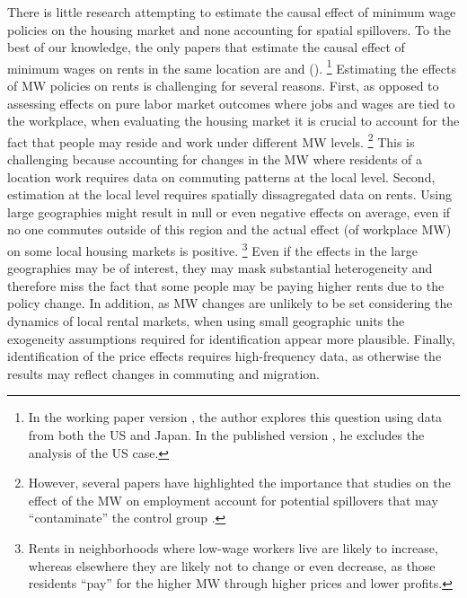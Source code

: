 
There is little research attempting to estimate the causal effect of minimum 
wage policies on the housing market and none accounting for spatial spillovers.
To the best of our knowledge, the only papers that estimate the causal effect of 
minimum wages on rents in the same location are \textcite{Tidemann2018} and 
\citeauthor{Yamagishi2019} (\citeyear{Yamagishi2019, Yamagishi2021}).%
\footnote{In the working paper version \parencite{Yamagishi2019}, the author 
explores this question using data from both the US and Japan.
In the published version \parencite{Yamagishi2021}, he excludes the analysis of 
the US case.}
Estimating the effects of MW policies on rents is challenging for several 
reasons. 
First, as opposed to assessing effects on pure labor market outcomes where jobs 
and wages are tied to the workplace, when evaluating the housing market it is 
crucial to account for the fact that people may reside and work under different 
MW levels.%
\footnote{However, several papers have highlighted the importance that studies
on the effect of the MW on employment account for potential spillovers that may
``contaminate'' the control group \parencite{Kuehn2016, Huang2020}.}
This is challenging because accounting for changes in the MW where residents
of a location work requires data on commuting patterns at the local level.
Second, estimation at the local level requires spatially dissagregated data on 
rents.
Using large geographies might result in null or even negative effects on average,
even if no one commutes outside of this region and the actual effect (of workplace
MW) on some local housing markets is positive.%
\footnote{Rents in neighborhoods where low-wage workers live are likely to 
increase, whereas elsewhere they are likely not to change or even decrease, 
as those residents ``pay'' for the higher MW through higher prices and lower 
profits.}
Even if the effects in the large geographies may be of interest, they may mask 
substantial heterogeneity and therefore miss the fact that some people may be 
paying higher rents due to the policy change.
In addition, as MW changes are unlikely to be set considering the dynamics of 
local rental markets, when using small geographic units the exogeneity assumptions 
required for identification appear more plausible.
Finally, identification of the price effects requires high-frequency data, 
as otherwise the results may reflect changes in commuting and migration.

